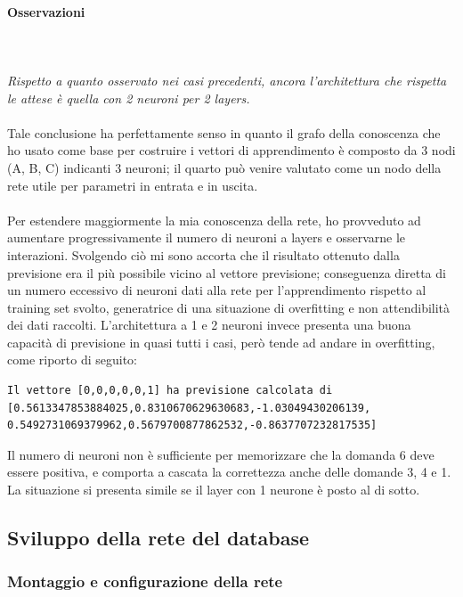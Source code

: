 \paragraph{Osservazioni}\mbox{}
\label{Osservazioni su rete a 4 neuroni per 1 layer}
\\\\
\noindent
\textit{Rispetto a quanto osservato nei casi precedenti, ancora l'architettura  che rispetta le attese \`e quella con 2 neuroni per 2 layers.}
\\\\
\noindent
Tale conclusione ha perfettamente senso in quanto il grafo della conoscenza che ho usato come base per costruire i vettori di apprendimento \`e composto da 3 nodi (A, B, C) indicanti 3 neuroni; il quarto pu\`o venire valutato come un nodo della rete utile per parametri in entrata e in uscita.
\\\\
Per estendere maggiormente la mia conoscenza della rete, ho provveduto ad aumentare progressivamente il numero di neuroni a layers e osservarne le interazioni. Svolgendo ci\`o mi sono accorta che il risultato ottenuto dalla previsione era il pi\`u possibile vicino al vettore previsione; conseguenza diretta di un numero eccessivo di neuroni dati alla rete per l'apprendimento rispetto al training set svolto, generatrice di una situazione di overfitting e non attendibilit\`a dei dati raccolti.
L'architettura a 1 e 2 neuroni invece presenta una buona capacit\`a di previsione in quasi tutti i casi, per\`o tende ad andare in overfitting, come riporto di seguito:
\begin{verbatim}
Il vettore [0,0,0,0,0,1] ha previsione calcolata di
[0.5613347853884025,0.8310670629630683,-1.03049430206139,
0.5492731069379962,0.5679700877862532,-0.8637707232817535]
\end{verbatim}
Il numero di neuroni non \`e sufficiente per memorizzare che la domanda 6 deve essere positiva, e comporta a cascata la correttezza anche delle domande 3, 4 e 1. La situazione si presenta simile se il layer con 1 neurone \`e posto al di sotto.


\subsection{Sviluppo della rete del database}
\label{Sviluppo della rete del database}

\subsubsection{Montaggio e configurazione della rete}
\label{Montaggio e configurazione della rete}

